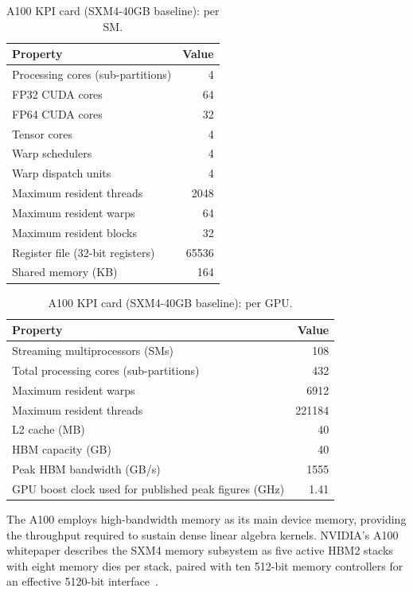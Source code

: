 \begin{table}[H]
\centering
\caption{A100 KPI card (SXM4-40GB baseline): per SM.}
\label{tab:a100-specs-sm}
\begin{tabularx}{\textwidth}{X r}
\toprule
Property & Value \\
\midrule
Processing cores (sub-partitions) & \num{4} \\
FP32 CUDA cores & \num{64} \\
FP64 CUDA cores & \num{32} \\
Tensor cores & \num{4} \\
Warp schedulers & \num{4} \\
Warp dispatch units & \num{4} \\
Maximum resident threads & \num{2048} \\
Maximum resident warps & \num{64} \\
Maximum resident blocks & \num{32} \\
Register file (32-bit registers) & \num{65536} \\
Shared memory (KB) & \num{164} \\
\bottomrule
\end{tabularx}
\end{table}

\begin{table}[H]
\centering
\caption{A100 KPI card (SXM4-40GB baseline): per GPU.}
\label{tab:a100-specs}
\begin{tabularx}{\textwidth}{X r}
\toprule
Property & Value \\
\midrule
Streaming multiprocessors (SMs) & \num{108} \\
Total processing cores (sub-partitions) & \num{432} \\
Maximum resident warps & \num{6912} \\
Maximum resident threads & \num{221184} \\
L2 cache (MB) & \num{40} \\
HBM capacity (GB) & \num{40} \\
Peak HBM bandwidth (GB/s) & \num{1555} \\
GPU boost clock used for published peak figures (GHz) & \num{1.41} \\
\bottomrule
\end{tabularx}
\end{table}

The A100 employs high-bandwidth memory as its main device memory, providing the
throughput required to sustain dense linear algebra kernels. NVIDIA's A100
whitepaper describes the SXM4 memory subsystem as five active HBM2 stacks with
eight memory dies per stack, paired with ten 512-bit memory controllers for an
effective 5120-bit interface~\cite{nvidia2020a100}.

